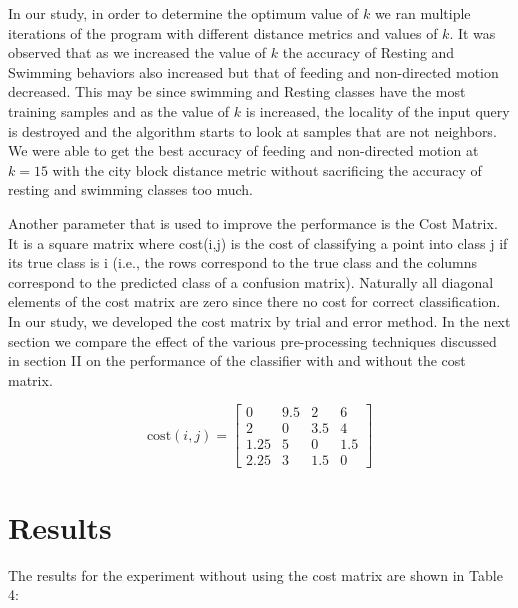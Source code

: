 \documentclass[conference]{IEEEtran}
\begin{document}
In our study, in order to determine the optimum value of $k$ we ran multiple iterations of the program with different distance metrics and values of $k$. It was observed that as we increased the value of $k$ the accuracy of Resting and Swimming behaviors also increased but that of feeding and non-directed motion decreased. This may be since swimming and Resting classes have the most training samples and as the value of $k$ is increased, the locality of the input query is destroyed and the algorithm starts to look at samples that are not neighbors.  We were able to get the best accuracy of feeding and non-directed motion at $k = 15$ with the city block distance metric without sacrificing the accuracy of resting and swimming classes too much.

Another parameter that is used to improve the performance is the Cost Matrix. It is a square matrix where cost(i,j) is the cost of classifying a point into class j if its true class is i (i.e., the rows correspond to the true class and the columns correspond to the predicted class of a confusion matrix). Naturally all diagonal elements of the cost matrix are zero since there no cost for correct classification. In our study, we developed the cost matrix by trial and error method. In the next section we compare the effect of the various pre-processing techniques discussed in section II on the performance of the classifier with and without the cost matrix.

$$
\mathrm{cost}(i, j) = \begin{bmatrix}
	0 & 9.5 & 2 & 6 \\
	2 & 0 & 3.5 & 4 \\
	1.25 & 5 & 0 & 1.5 \\
	2.25 & 3 & 1.5 & 0
\end{bmatrix}
$$

\section{Results}

The results for the experiment without using the cost matrix are shown in Table 4:

\end{document}
